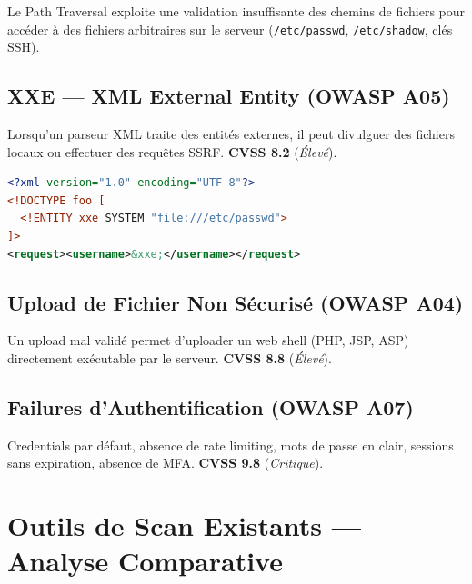 \documentclass[12pt,a4paper]{report}
\newcommand{\cvss}[2]{\textbf{\textcolor{owaspred}{CVSS #1}} (\textit{#2})}
\newcommand{\code}[1]{\texttt{#1}}
\begin{document}
Le Path Traversal exploite une validation insuffisante des chemins de fichiers pour accéder à
des fichiers arbitraires sur le serveur (\code{/etc/passwd}, \code{/etc/shadow}, clés SSH).

\subsection{XXE — XML External Entity (OWASP A05)}

Lorsqu'un parseur XML traite des entités externes, il peut divulguer des fichiers locaux ou
effectuer des requêtes SSRF. \cvss{8.2}{Élevé}.

\begin{lstlisting}[language=xml, caption={Payload XXE — lecture de fichier}]
<?xml version="1.0" encoding="UTF-8"?>
<!DOCTYPE foo [
  <!ENTITY xxe SYSTEM "file:///etc/passwd">
]>
<request><username>&xxe;</username></request>
\end{lstlisting}

\subsection{Upload de Fichier Non Sécurisé (OWASP A04)}

Un upload mal validé permet d'uploader un web shell (PHP, JSP, ASP) directement exécutable
par le serveur. \cvss{8.8}{Élevé}.

\subsection{Failures d'Authentification (OWASP A07)}

Credentials par défaut, absence de rate limiting, mots de passe en clair, sessions sans
expiration, absence de MFA. \cvss{9.8}{Critique}.

\section{Outils de Scan Existants — Analyse Comparative}
\end{document}
